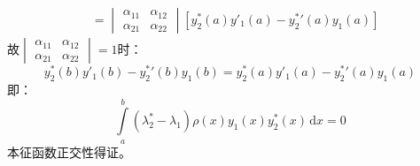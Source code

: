 \documentclass[a4paper,fontset=windows]{ctexart}
\begin{document}
\begin{itemize}
\begin{align*}
&= \begin{vmatrix}\alpha_{11} & \alpha_{12} \\ \alpha_{21} & \alpha_{22}\end{vmatrix}\left[y_2^*(a)y'_1(a) - {y_2^*}'(a)y_1(a)\right]
\end{align*}
故$\begin{vmatrix}\alpha_{11} & \alpha_{12} \\ \alpha_{21} & \alpha_{22}\end{vmatrix} = 1$时：
\[
y_2^*(b)y'_1(b) -{y_2^*}'(b)y_1(b) = y_2^*(a)y'_1(a) - {y_2^*}'(a)y_1(a)
\]
即：
\[
\int\limits_{a}^{b}(\lambda_2^* - \lambda_1)\rho(x)y_1(x)y_2^*(x)\,\mathrm{d}x = 0
\]
本征函数正交性得证。

\end{itemize}
\end{document}
